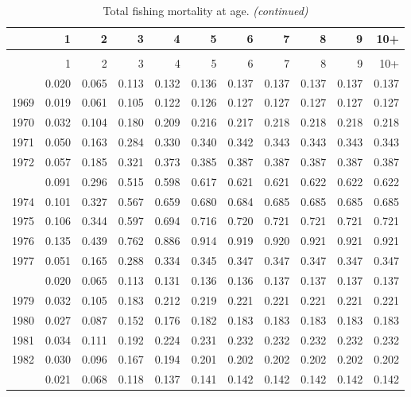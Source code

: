 \documentclass[
]{article}
\begin{document}
\begin{longtable}[t]{lrrrrrrrrrr}
\caption{\label{tab:FAA-tot-table}Total fishing mortality at age.}\\
\toprule
  & 1 & 2 & 3 & 4 & 5 & 6 & 7 & 8 & 9 & 10+\\
\midrule
\endfirsthead
\caption[]{Total fishing mortality at age. \textit{(continued)}}\\
\toprule
  & 1 & 2 & 3 & 4 & 5 & 6 & 7 & 8 & 9 & 10+\\
\midrule
\endhead

\endfoot
\bottomrule
\endlastfoot
1968 & 0.020 & 0.065 & 0.113 & 0.132 & 0.136 & 0.137 & 0.137 & 0.137 & 0.137 & 0.137\\
1969 & 0.019 & 0.061 & 0.105 & 0.122 & 0.126 & 0.127 & 0.127 & 0.127 & 0.127 & 0.127\\
1970 & 0.032 & 0.104 & 0.180 & 0.209 & 0.216 & 0.217 & 0.218 & 0.218 & 0.218 & 0.218\\
1971 & 0.050 & 0.163 & 0.284 & 0.330 & 0.340 & 0.342 & 0.343 & 0.343 & 0.343 & 0.343\\
1972 & 0.057 & 0.185 & 0.321 & 0.373 & 0.385 & 0.387 & 0.387 & 0.387 & 0.387 & 0.387\\
\addlinespace
1973 & 0.091 & 0.296 & 0.515 & 0.598 & 0.617 & 0.621 & 0.621 & 0.622 & 0.622 & 0.622\\
1974 & 0.101 & 0.327 & 0.567 & 0.659 & 0.680 & 0.684 & 0.685 & 0.685 & 0.685 & 0.685\\
1975 & 0.106 & 0.344 & 0.597 & 0.694 & 0.716 & 0.720 & 0.721 & 0.721 & 0.721 & 0.721\\
1976 & 0.135 & 0.439 & 0.762 & 0.886 & 0.914 & 0.919 & 0.920 & 0.921 & 0.921 & 0.921\\
1977 & 0.051 & 0.165 & 0.288 & 0.334 & 0.345 & 0.347 & 0.347 & 0.347 & 0.347 & 0.347\\
\addlinespace
1978 & 0.020 & 0.065 & 0.113 & 0.131 & 0.136 & 0.136 & 0.137 & 0.137 & 0.137 & 0.137\\
1979 & 0.032 & 0.105 & 0.183 & 0.212 & 0.219 & 0.221 & 0.221 & 0.221 & 0.221 & 0.221\\
1980 & 0.027 & 0.087 & 0.152 & 0.176 & 0.182 & 0.183 & 0.183 & 0.183 & 0.183 & 0.183\\
1981 & 0.034 & 0.111 & 0.192 & 0.224 & 0.231 & 0.232 & 0.232 & 0.232 & 0.232 & 0.232\\
1982 & 0.030 & 0.096 & 0.167 & 0.194 & 0.201 & 0.202 & 0.202 & 0.202 & 0.202 & 0.202\\
\addlinespace
1983 & 0.021 & 0.068 & 0.118 & 0.137 & 0.141 & 0.142 & 0.142 & 0.142 & 0.142 & 0.142\\

\end{longtable}
\end{document}
